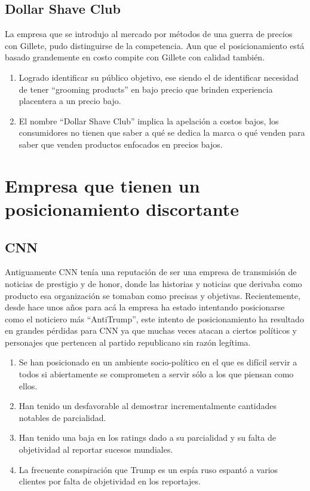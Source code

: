 \documentclass{article}
\begin{document}
\subsection{Dollar Shave Club}
La empresa que se introdujo al mercado por métodos de una guerra de precios con Gillete, pudo distinguirse de la competencia. Aun que el posicionamiento está basado grandemente en costo compite con Gillete con calidad también.
\begin{enumerate}
    \item Logrado identificar su público objetivo, ese siendo el de identificar necesidad de tener ``grooming products'' en bajo precio que brinden experiencia placentera a un precio bajo.
    \item El nombre ``Dollar Shave Club'' implica la apelación a costos bajos, los consumidores no tienen que saber a qué se dedica la marca o qué venden para saber que venden productos enfocados en precios bajos.
\end{enumerate}


\section{Empresa que tienen un posicionamiento discortante}
\subsection{CNN}
Antiguamente CNN tenía una reputación de ser una empresa de transmisión de noticias de prestigio y de honor, donde las historias y noticias que derivaba como producto esa organización se tomaban como precisas y objetivas. Recientemente, desde hace unos años para acá la empresa ha estado intentando posicionarse como el noticiero más ``AntiTrump'', este intento de posicionamiento ha resultado en grandes pérdidas para CNN ya que muchas veces atacan a ciertos políticos y personajes que pertencen al partido republicano sin razón legítima. 
\begin{enumerate}
    \item Se han posicionado en un ambiente socio-político en el que es difícil servir a todos si abiertamente se comprometen a servir sólo a los que piensan como ellos.
    \item Han tenido un desfavorable al demostrar incrementalmente cantidades notables de parcialidad.
    \item Han tenido una baja en los ratings dado a su parcialidad y su falta de objetividad al reportar sucesos mundiales.
    \item La frecuente conspiración que Trump es un espía ruso espantó a varios clientes por falta de objetividad en los reportajes.
\end{enumerate}
\end{document}
